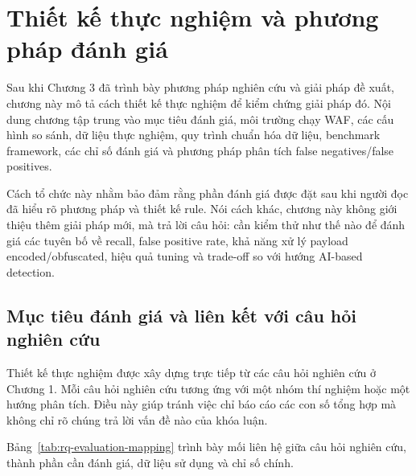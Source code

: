 \chapter{Thiết kế thực nghiệm và phương pháp đánh giá}
\label{chap:evaluation-method}

Sau khi Chương 3 đã trình bày phương pháp nghiên cứu và giải pháp đề xuất, chương này mô tả cách thiết kế thực nghiệm để kiểm chứng giải pháp đó. Nội dung chương tập trung vào mục tiêu đánh giá, môi trường chạy WAF, các cấu hình so sánh, dữ liệu thực nghiệm, quy trình chuẩn hóa dữ liệu, benchmark framework, các chỉ số đánh giá và phương pháp phân tích false negatives/false positives.

Cách tổ chức này nhằm bảo đảm rằng phần đánh giá được đặt sau khi người đọc đã hiểu rõ phương pháp và thiết kế rule. Nói cách khác, chương này không giới thiệu thêm giải pháp mới, mà trả lời câu hỏi: cần kiểm thử như thế nào để đánh giá các tuyên bố về recall, false positive rate, khả năng xử lý payload encoded/obfuscated, hiệu quả tuning và trade-off so với hướng AI-based detection.

\section{Mục tiêu đánh giá và liên kết với câu hỏi nghiên cứu}
\label{sec:evaluation-goals-rq}

Thiết kế thực nghiệm được xây dựng trực tiếp từ các câu hỏi nghiên cứu ở Chương 1. Mỗi câu hỏi nghiên cứu tương ứng với một nhóm thí nghiệm hoặc một hướng phân tích. Điều này giúp tránh việc chỉ báo cáo các con số tổng hợp mà không chỉ rõ chúng trả lời vấn đề nào của khóa luận.

Bảng~\ref{tab:rq-evaluation-mapping} trình bày mối liên hệ giữa câu hỏi nghiên cứu, thành phần cần đánh giá, dữ liệu sử dụng và chỉ số chính.


